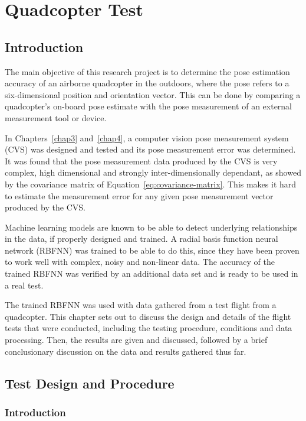 \chapter{Quadcopter Test}
\label{chap5}

\section{Introduction}

The main objective of this research project is to determine the pose estimation accuracy of an airborne quadcopter in the outdoors, where the pose refers to a six-dimensional position and orientation vector. This can be done by comparing a quadcopter's on-board pose estimate with the pose measurement of an external measurement tool or device.  

In Chapters~\ref{chap3} and~\ref{chap4}, a computer vision pose measurement system (CVS) was designed and tested and its pose measurement error was determined. It was found that the pose measurement data produced by the CVS is very complex, high dimensional and strongly inter-dimensionally dependant, as showed by the covariance matrix of Equation~\ref{eq:covariance-matrix}. This makes it hard to estimate the measurement error for any given pose measurement vector produced by the CVS.\@ 

Machine learning models are known to be able to detect underlying relationships in the data, if properly designed and trained. A radial basis function neural network (RBFNN) was trained to be able to do this, since they have been proven to work well with complex, noisy and non-linear data. The accuracy of the trained RBFNN was verified by an additional data set and is ready to be used in a real test. 

The trained RBFNN was used with data gathered from a test flight from a quadcopter. This chapter sets out to discuss the design and details of the flight tests that were conducted, including the testing procedure, conditions and data processing. Then, the results are given and discussed, followed by a brief conclusionary discussion on the data and results gathered thus far. 

\section{Test Design and Procedure}

\subsection{Introduction}


